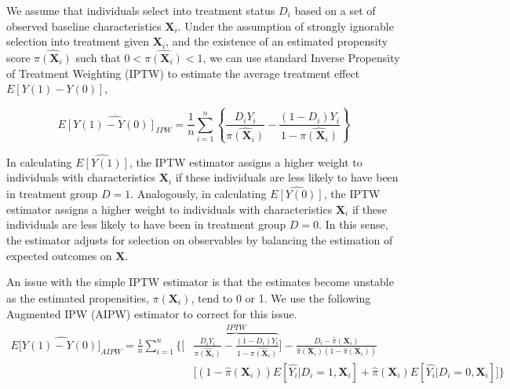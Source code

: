We assume that individuals select into treatment status $D_i$ based on a set of observed baseline characteristics $\boldsymbol{X}_i$. Under the assumption of strongly ignorable selection into treatment given $\boldsymbol{X}_i$, and the existence of an estimated propensity score $\hat{\pi({\boldsymbol{X}_i})}$ such that $0<\hat{\pi({\boldsymbol{X}_i})}<1$, we can use standard Inverse Propensity of Treatment Weighting (IPTW) to estimate the average treatment effect $E[Y(1)-Y(0)]$,

\begin{equation}\label{eq:IPW}
\widehat{E[Y(1)-Y(0)]_{IPW}} = \frac{1}{n} \sum_{i=1}^{n} \left \{\frac{D_i Y_i}{\hat{\pi(\boldsymbol{X}_i)}} - \frac{(1-D_i)Y_i}{1-\hat{\pi(\boldsymbol{X}_i)}}\right \}
\end{equation}

In calculating $\widehat{E[Y(1)]}$, the IPTW estimator assigns a higher weight to individuals with characteristics $\boldsymbol{X}_i$ if these individuals are less likely to have been in treatment group $D = 1$. Analogously, in calculating $\widehat{E[Y(0)]}$,  the IPTW estimator assigns a higher weight to individuals with characteristics $\boldsymbol{X}_i$ if these individuals are less likely to have been in treatment group $D = 0$. In this sense, the estimator adjusts for selection on observables by balancing the estimation of expected outcomes on $\boldsymbol{X}$.

An issue with the simple IPTW estimator is that the estimates become unstable as the estimated propensities, $\hat{\pi(\boldsymbol{X}_i)}$, tend to 0 or 1. We use the following Augmented IPW (AIPW) estimator to correct for this issue. 
\begin{align}\label{eq:AIPW}
E[\widehat{Y(1)-Y(0)]}_{AIPW} = \frac{1}{n} \sum_{i=1}^{n} \bigg \{ \bigg[ & \overbrace{\frac{D_i Y_i}{\hat{\pi(\boldsymbol{X}_i)}} - \frac{(1-D_i)Y_i}{1-\hat{\pi(\boldsymbol{X}_i)}}}^{IPTW} \bigg]- \frac{D_i - \hat{\pi}(\boldsymbol{X}_i)}{\hat{\pi}(\boldsymbol{X}_i) (1-\hat{\pi}(\boldsymbol{X}_i))} \nonumber \\[10pt]
& \bigg[ (1-\hat{\pi}(\boldsymbol{X}_i)) E[\hat{Y_i}|D_i=1,\boldsymbol{X}_i] + \hat{\pi}(\boldsymbol{X}_i) E[\hat{Y_i}|D_i=0,\boldsymbol{X}_i] \bigg] \bigg \}
\end{align}

